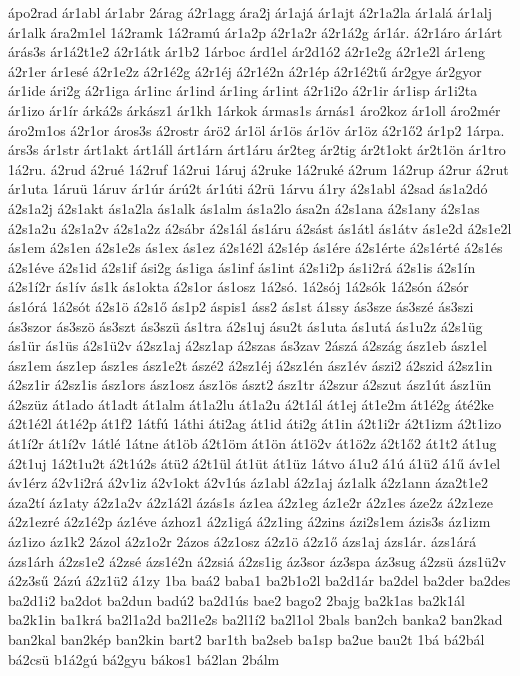 {ápo2rad
ár1abl
ár1abr
2árag
á2r1agg
ára2j
ár1ajá
ár1ajt
á2r1a2la
ár1alá
ár1alj
ár1alk
ára2m1el
1á2ramk
1á2ramú
ár1a2p
á2r1a2r
á2r1á2g
ár1ár.
á2r1áro
ár1árt
árás3s
ár1á2t1e2
á2r1átk
ár1b2
1árboc
árd1el
ár2d1ó2
á2r1e2g
á2r1e2l
ár1eng
á2r1er
ár1esé
á2r1e2z
á2r1é2g
á2r1éj
á2r1é2n
á2r1ép
á2r1é2tű
ár2gye
ár2gyor
ár1ide
ári2g
á2r1iga
ár1inc
ár1ind
ár1ing
ár1int
á2r1i2o
á2r1ir
ár1isp
ár1i2ta
ár1izo
ár1ír
árká2s
árkász1
ár1kh
1árkok
ármas1s
árnás1
áro2koz
ár1oll
áro2mér
áro2m1os
á2r1or
áros3s
á2rostr
árö2
ár1öl
ár1ös
ár1öv
ár1öz
á2r1ő2
ár1p2
1árpa.
árs3s
ár1str
árt1akt
árt1áll
árt1árn
árt1áru
ár2teg
ár2tig
ár2t1okt
ár2t1ön
ár1tro
1á2ru.
á2rud
á2rué
1á2ruf
1á2rui
1áruj
á2ruke
1á2ruké
á2rum
1á2rup
á2rur
á2rut
ár1uta
1áruü
1áruv
ár1úr
árú2t
ár1úti
á2rü
1árvu
á1ry
á2s1abl
á2sad
ás1a2dó
á2s1a2j
á2s1akt
ás1a2la
ás1alk
ás1alm
ás1a2lo
ása2n
á2s1ana
á2s1any
á2s1as
á2s1a2u
á2s1a2v
á2s1a2z
á2sábr
á2s1ál
ás1áru
á2sást
ás1átl
ás1átv
ás1e2d
á2s1e2l
ás1em
á2s1en
á2s1e2s
ás1ex
ás1ez
á2s1é2l
á2s1ép
ás1ére
á2s1érte
á2s1érté
á2s1és
á2s1éve
á2s1id
á2s1if
ási2g
ás1iga
ás1inf
ás1int
á2s1i2p
ás1i2rá
á2s1is
á2s1ín
á2s1í2r
ás1ív
ás1k
ás1okta
á2s1or
ás1osz
1á2só.
1á2sój
1á2sók
1á2són
á2sór
ás1órá
1á2sót
á2s1ö
á2s1ő
ás1p2
áspis1
áss2
ás1st
á1ssy
ás3sze
ás3szé
ás3szi
ás3szor
ás3szö
ás3szt
ás3szü
ás1tra
á2s1uj
ásu2t
ás1uta
ás1utá
ás1u2z
á2s1üg
ás1ür
ás1üs
á2s1ü2v
á2sz1aj
á2sz1ap
á2szas
ás3zav
2ászá
á2szág
ász1eb
ász1el
ász1em
ász1ep
ász1es
ász1e2t
ászé2
á2sz1éj
á2sz1én
ász1év
ászi2
á2szid
á2sz1in
á2sz1ir
á2sz1is
ász1ors
ász1osz
ász1ös
ászt2
ász1tr
á2szur
á2szut
ász1út
ász1ün
á2szüz
át1ado
át1adt
át1alm
át1a2lu
át1a2u
á2t1ál
át1ej
át1e2m
át1é2g
áté2ke
á2t1é2l
át1é2p
át1f2
1átfú
1áthi
áti2ag
át1id
áti2g
át1in
á2t1i2r
á2t1izm
á2t1izo
át1í2r
át1í2v
1átlé
1átne
át1öb
á2t1öm
át1ön
át1ö2v
át1ö2z
á2t1ő2
át1t2
át1ug
á2t1uj
1á2t1u2t
á2t1ú2s
átü2
á2t1ül
át1üt
át1üz
1átvo
á1u2
á1ú
á1ü2
á1ű
áv1el
áv1érz
á2v1i2rá
á2v1iz
á2v1okt
á2v1ús
áz1abl
á2z1aj
áz1alk
á2z1ann
áza2t1e2
áza2tí
áz1aty
á2z1a2v
á2z1á2l
ázás1s
áz1ea
á2z1eg
áz1e2r
á2z1es
áze2z
á2z1eze
á2z1ezré
á2z1é2p
áz1éve
ázhoz1
á2z1igá
á2z1ing
á2zins
ázi2s1em
ázis3s
áz1izm
áz1izo
áz1k2
2ázol
á2z1o2r
2ázos
á2z1osz
á2z1ö
á2z1ő
ázs1aj
ázs1ár.
ázs1árá
ázs1árh
á2zs1e2
á2zsé
ázs1é2n
á2zsiá
á2zs1ig
áz3sor
áz3spa
áz3sug
á2zsü
ázs1ü2v
á2z3sű
2ázú
á2z1ü2
á1zy
1ba
baá2
baba1
ba2b1o2l
ba2d1ár
ba2del
ba2der
ba2des
ba2d1i2
ba2dot
ba2dun
badú2
ba2d1ús
bae2
bago2
2bajg
ba2k1as
ba2k1ál
ba2k1in
ba1krá
ba2l1a2d
ba2l1e2s
ba2l1í2
ba2l1ol
2bals
ban2ch
banka2
ban2kad
ban2kal
ban2kép
ban2kin
bart2
bar1th
ba2seb
ba1sp
ba2ue
bau2t
1bá
bá2bál
bá2csü
b1á2gú
bá2gyu
bákos1
bá2lan
2bálm
}
